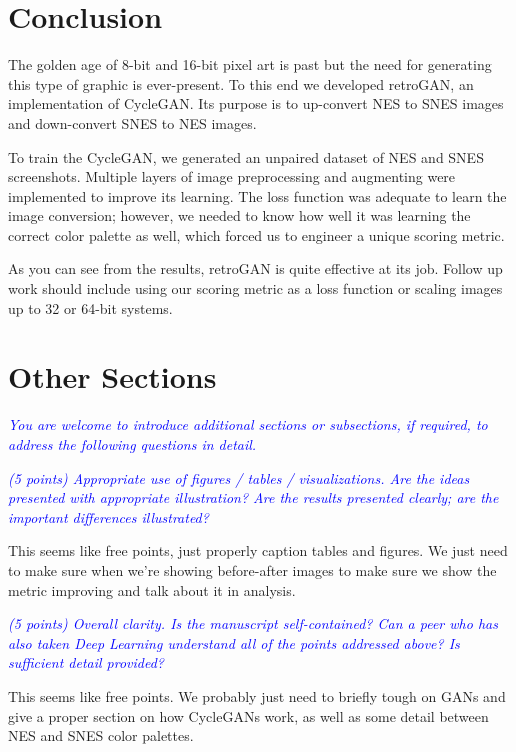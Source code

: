 \documentclass[10pt,twocolumn,letterpaper]{article}
\begin{document}
\section{Conclusion}

The golden age of 8-bit and 16-bit pixel art is past but the need for generating this type of graphic is ever-present. To this end we developed retroGAN, an implementation of CycleGAN. Its purpose is to up-convert NES to SNES images and down-convert SNES to NES images.

To train the CycleGAN, we generated an unpaired dataset of NES and SNES screenshots. Multiple layers of image preprocessing and augmenting were implemented to improve its learning. The loss function was adequate to learn the image conversion; however, we needed to know how well it was learning the correct color palette as well, which forced us to engineer a unique scoring metric.

As you can see from the results, retroGAN is quite effective at its job. Follow up work should include using our scoring metric as a loss function or scaling images up to 32 or 64-bit systems.

\section{Other Sections}

\textit{\textcolor{blue}{You are welcome to introduce additional sections or subsections, if required, to address the following questions in detail.}}

\textit{\textcolor{blue}{(5 points) Appropriate use of figures / tables / visualizations. Are the ideas presented with appropriate illustration? Are the results presented clearly; are the important differences illustrated?}}

This seems like free points, just properly caption tables and figures. We just need to make sure when we're showing before-after images to make sure we show the metric improving and talk about it in analysis.

\textit{\textcolor{blue}{(5 points) Overall clarity. Is the manuscript self-contained? Can a peer who has also taken Deep Learning understand all of the points addressed above? Is sufficient detail provided?}}

This seems like free points. We probably just need to briefly tough on GANs and give a proper section on how CycleGANs work, as well as some detail between NES and SNES color palettes.
\end{document}
